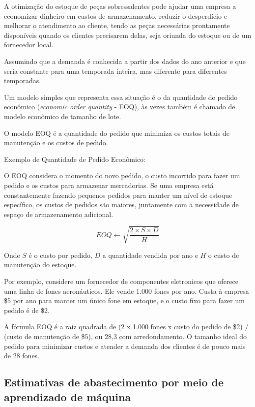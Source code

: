 \documentclass{amsart}
\begin{document}
A otimização do estoque de peças sobressalentes pode ajudar uma empresa a economizar dinheiro em custos de armazenamento, reduzir o desperdício e melhorar o atendimento ao cliente, tendo as peças necessárias prontamente disponíveis quando os clientes precisarem delas, seja oriunda do estoque ou de um fornecedor local.

Assumindo que a demanda é conhecida a partir dos dados do ano anterior e que seria constante para uma temporada inteira, mas diferente para diferentes temporadas.

Um modelo simples que representa essa situação é o da quantidade de pedido econômico ({\it economic order quantity} - EOQ), às vezes também é chamado de modelo econômico de tamanho de lote.

O modelo EOQ é a quantidade do pedido que minimiza os custos totais de manutenção e os custos de pedido.

Exemplo de Quantidade de Pedido Econômico:

O EOQ considera o momento do novo pedido, o custo incorrido para fazer um pedido e os custos para armazenar mercadorias. Se uma empresa está constantemente fazendo pequenos pedidos para manter um nível de estoque específico, os custos de pedidos são maiores, juntamente com a necessidade de espaço de armazenamento adicional.

\begin{equation} \label{eq:eoq}
	EOQ \gets \sqrt{\frac{2 \times S \times D}{H}}
\end{equation}

Onde $S$ é o custo por pedido, $D$ a quantidade vendida por ano e $H$ o custo de manutenção do estoque.

Por exemplo, considere um fornecedor de componentes eletronicos que oferece uma linha de fones aeronáuticos. Ele vende 1.000 fones por ano. Custa à empresa \$5 por ano para manter um único fone em estoque, e o custo fixo para fazer um pedido é de \$2.

A fórmula EOQ é a raiz quadrada de (2 x 1.000 fones x custo do pedido de \$2) / (custo de manutenção de \$5), ou 28,3 com arredondamento. O tamanho ideal do pedido para minimizar custos e atender a demanda dos clientes é de pouco mais de 28 fones.

\subsection{Estimativas de abastecimento por meio de aprendizado de máquina}
\end{document}
